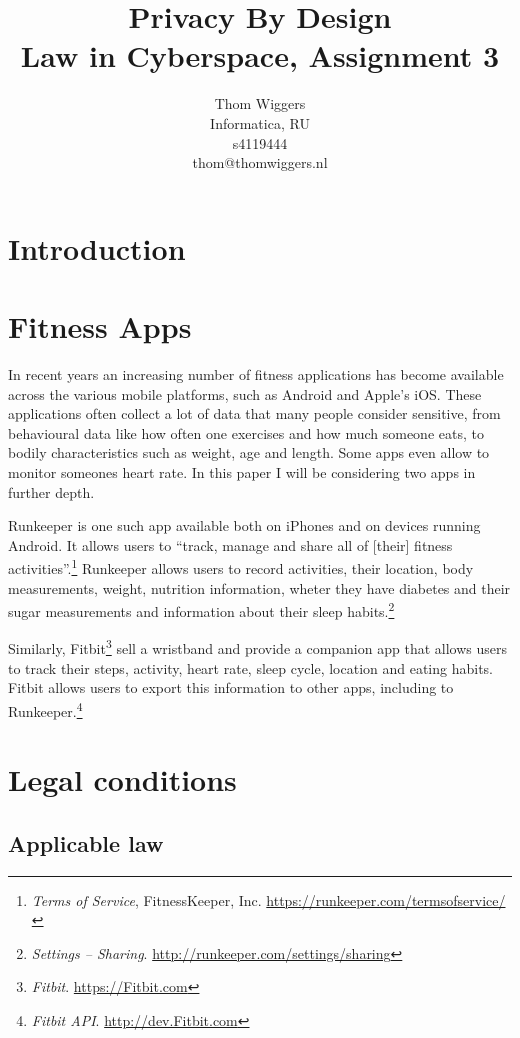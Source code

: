 \documentclass{article}
\author{Thom Wiggers\\ \small Informatica, RU \\ \small s4119444 \\ \small thom@thomwiggers.nl }
\title{Privacy By Design\\ {\large Law in Cyberspace, Assignment 3}}
\begin{document}
\maketitle

\section{Introduction}

\section{Fitness Apps}

In recent years an increasing number of fitness applications has become available across the various mobile platforms, such as Android and Apple's iOS.
These applications often collect a lot of data that many people consider sensitive, from behavioural data like how often one exercises and how much someone eats, to bodily characteristics such as weight, age and length.
Some apps even allow to monitor someones heart rate. In this paper I will be considering two apps in further depth.

Runkeeper is one such app available both on iPhones and on devices running Android. It allows users to ``track, manage and share all of [their] fitness activities''.\footnote{\emph{Terms of Service}, FitnessKeeper, Inc. \url{https://runkeeper.com/termsofservice/}}
Runkeeper allows users to record activities, their location, body measurements, weight, nutrition information, wheter they have diabetes and their sugar measurements and information about their sleep habits.\footnote{\emph{Settings -- Sharing}. \url{http://runkeeper.com/settings/sharing}}

Similarly, Fitbit\footnote{\emph{Fitbit}. \url{https://Fitbit.com}} sell a wristband and provide a companion app that allows users to track their steps, activity, heart rate, sleep cycle, location and eating habits.
Fitbit allows users to export this information to other apps, including to Runkeeper.\footnote{\emph{Fitbit API}. \url{http://dev.Fitbit.com}}

\section{Legal conditions}

\subsection{Applicable law}
\end{document}
